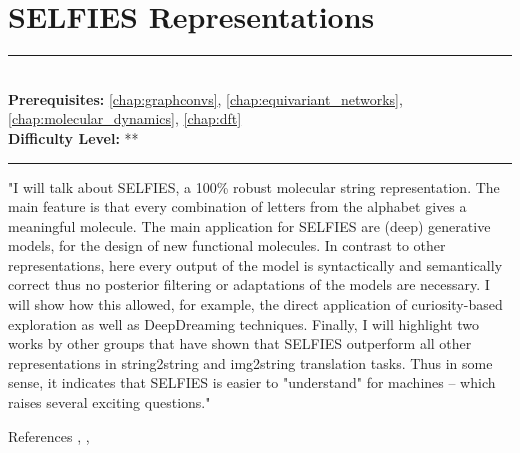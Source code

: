 \documentclass[book.tex]{subfiles}
\begin{document}
\chapter{SELFIES Representations}

\label{chap:selfies}
\noindent\rule{11cm}{0.4pt} \\
\textbf{Prerequisites:} \autoref{chap:graphconvs}, \autoref{chap:equivariant_networks}, \autoref{chap:molecular_dynamics},  \autoref{chap:dft} \\
\textbf{Difficulty Level:} ** \\
\noindent\rule{11cm}{0.4pt}
\vspace{5mm}

"I will talk about SELFIES, a 100\% robust molecular string representation. The main feature is that every combination of letters from the alphabet gives a meaningful molecule. The main application for SELFIES are (deep) generative models, for the design of new functional molecules. In contrast to other representations, here every output of the model is syntactically and semantically correct thus no posterior filtering or adaptations of the models are necessary. I will show how this allowed, for example, the direct application of curiosity-based exploration as well as DeepDreaming techniques. Finally, I will highlight two works by other groups that have shown that SELFIES outperform all other representations in string2string and img2string translation tasks. Thus in some sense, it indicates that SELFIES is easier to "understand" for machines -- which raises several exciting questions."

References \cite{thiede2020curiosity}, \cite{shen2021deep}, \cite{krenn2020self}
\end{document}
